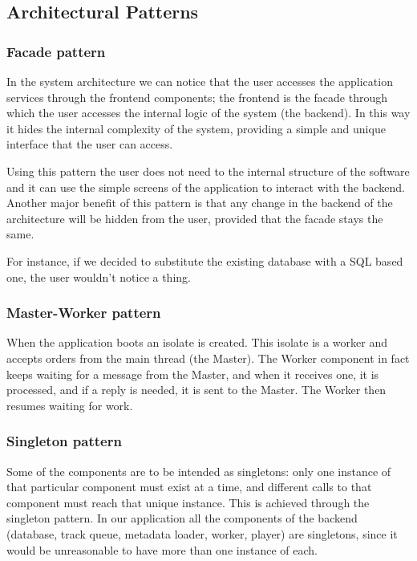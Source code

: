 \documentclass{article}
\begin{document}
\subsection{Architectural Patterns}

\subsubsection{Facade pattern}
In the system architecture we can notice that the user accesses the application
services through the frontend components; the frontend is the facade through
which the user accesses the internal logic of the system (the backend). In this
way it hides the internal complexity of the system, providing a simple and
unique interface that the user can access.

Using this pattern the user does not need to the internal structure of the
software and it can use the simple screens of the application to interact with
the backend. Another major benefit of this pattern is that any change in the
backend of the architecture will be hidden from the user, provided that
the facade stays the same.

For instance, if we decided to substitute the existing database with a SQL based
one, the user wouldn't notice a thing.

\subsubsection{Master-Worker pattern}
When the application boots an isolate is created. This isolate is a worker and
accepts orders from the main thread (the Master). The Worker component in fact
keeps waiting for a message from the Master, and when it receives one, it is
processed, and if a reply is needed, it is sent to the Master. The Worker then
resumes waiting for work.

\subsubsection{Singleton pattern}
Some of the components are to be intended as singletons: only one instance of
that particular component must exist at a time, and different calls to that
component must reach that unique instance. This is achieved through the
singleton pattern. In our application all the components of the backend
(database, track queue, metadata loader, worker, player) are singletons, since
it would be unreasonable to have more than one instance of each.
\end{document}
